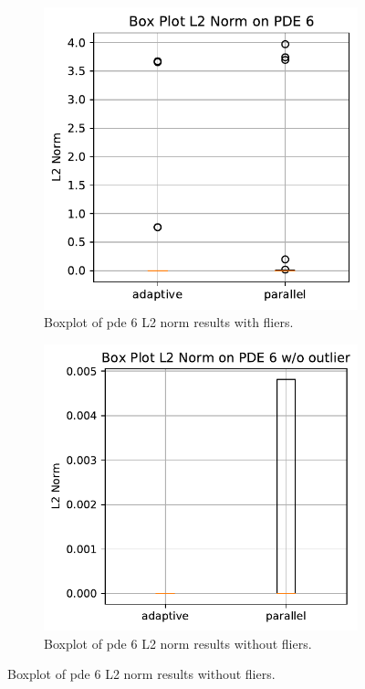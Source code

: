\documentclass[./\jobname.tex]{subfiles}
\begin{document}
\begin{figure}[H]
	\centering
	\begin{subfigure}[b]{0.381\linewidth}
		\centering
		\includegraphics[width=1\textwidth]{../../code/experiments/experiment_2/pde6_L2_norm_boxplot.pdf}
		\caption{Boxplot of \gls{pde} 6 L2 norm results with fliers.}
		\label{fig:paJADE_pde6_l2norm_boxplot}
	\end{subfigure}%
	\begin{subfigure}[b]{0.4\linewidth}
		\centering
		\includegraphics[width=1\textwidth]{../../code/experiments/experiment_2/pde6_L2_norm_boxplot_wo_outlier.pdf}
		\caption{Boxplot of \gls{pde} 6 L2 norm results without fliers.}
		\label{fig:paJADE_pde6_l2norm_boxplot_cleared}
	\end{subfigure}%
	\label{fig:paJADE_pde6_l2norm_boxplot_comparison}
\end{figure}
\end{document}

